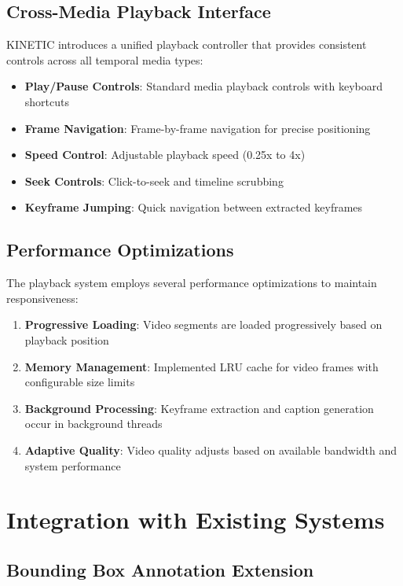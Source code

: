 \documentclass[10pt]{article}
\begin{document}
\subsection{Cross-Media Playback Interface}

KINETIC introduces a unified playback controller that provides consistent controls across all temporal media types:

\begin{itemize}
    \item \textbf{Play/Pause Controls}: Standard media playback controls with keyboard shortcuts
    \item \textbf{Frame Navigation}: Frame-by-frame navigation for precise positioning
    \item \textbf{Speed Control}: Adjustable playback speed (0.25x to 4x)
    \item \textbf{Seek Controls}: Click-to-seek and timeline scrubbing
    \item \textbf{Keyframe Jumping}: Quick navigation between extracted keyframes
\end{itemize}

\subsection{Performance Optimizations}

The playback system employs several performance optimizations to maintain responsiveness:

\begin{enumerate}
    \item \textbf{Progressive Loading}: Video segments are loaded progressively based on playback position
    \item \textbf{Memory Management}: Implemented LRU cache for video frames with configurable size limits
    \item \textbf{Background Processing}: Keyframe extraction and caption generation occur in background threads
    \item \textbf{Adaptive Quality}: Video quality adjusts based on available bandwidth and system performance
\end{enumerate}

\section{Integration with Existing Systems}

\subsection{Bounding Box Annotation Extension}
\end{document}

